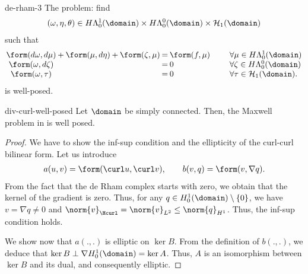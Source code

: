 \begin{Lemma}{de-rham-3}
  The problem: find
  \begin{gather}
    (\omega,\eta,\theta)
    \in H\Lambda^1_0(\domain)
    \times H\Lambda^{0}_0(\domain)
    \times \mathcal H_1(\domain)
  \end{gather}
   such that
  \begin{gather}
    \arraycolsep1pt
    \begin{array}{cccccclll}
      \form(d \omega, d\mu) &+& \form(\mu,d\eta) &+& \form(\zeta,\mu)
      &=& \form(f,\mu)
      & \qquad & \forall \mu\in H\Lambda^1_0(\domain)
      \\
      \form(\omega,d\zeta) && && &=&0
      & \qquad & \forall \zeta\in H\Lambda^{0}_0(\domain)
      \\
      \form(\omega,\tau) && && &=& 0
      & \qquad & \forall \tau\in \mathcal H_1(\domain).
    \end{array}
  \end{gather}
  is well-posed.
\end{Lemma}

\begin{Theorem}{div-curl-well-posed}
  Let $\domain$ be simply connected. Then, the Maxwell problem in
   is well posed.
\end{Theorem}

\begin{proof}
  We have to show the inf-sup condition and the ellipticity of the
  curl-curl bilinear form. Let us introduce
  \begin{gather}
    a(u,v) = \form(\curl u, \curl v),
    \qquad
    b(v,q) = \form(v,\nabla q).
  \end{gather}
  From the fact that the de Rham complex starts with zero, we obtain
  that the kernel of the gradient is zero. Thus, for any $q\in
  H^1_0(\domain)\setminus\{0\}$, we have $v = \nabla q \neq 0$ and
  $\norm{v}_{\Hcurl} = \norm{v}_{L^2} \le \norm{q}_{H^1}$. Thus, the
  inf-sup condition holds.

  We show now that $a(.,.)$ is elliptic on $\ker B$. From the
  definition of $b(.,.)$, we deduce that
  $\ker B \perp \nabla H^1_0(\domain) = \ker A$. Thus, $A$ is an
  isomorphism between $\ker B$ and its dual, and consequently
  elliptic.
\end{proof}

